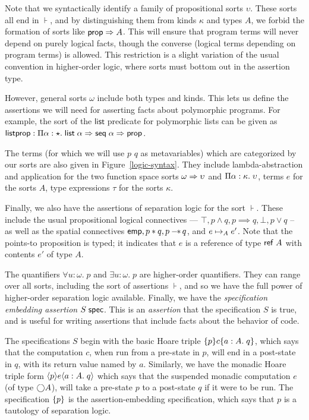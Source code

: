 Note that we syntactically identify a family of propositional sorts
$\upsilon$. These sorts all end in $\assert$, and by distinguishing
them from kinds $\kappa$ and types $A$, we forbid the formation of
sorts like $\mathsf{prop} \Rightarrow A$. This will ensure that program terms will
never depend on purely logical facts, though the converse (logical
terms depending on program terms) is allowed. This restriction is a
slight variation of the usual convention in higher-order logic, where
sorts must bottom out in the assertion type.

However, general sorts $\omega$ include both types and kinds. This
lets us define the assertions we will need for asserting facts about
polymorphic programs. For example, the sort of the $\mathsf{list}$
predicate for polymorphic lists can be given as $\mathsf{listprop} :
\Pi {\alpha}:{\star}.\;{\mathsf{list}\;{\alpha} \Rightarrow \mathsf{seq}\;{\alpha} \Rightarrow
  \mathsf{prop}}$.


The terms (for which we will use $p$ $q$ as metavariables) which are
categorized by our sorts are also given in Figure~\ref{logic-syntax}.
They include lambda-abstraction and application for the two function
space sorts $\omega \Rightarrow \upsilon$ and
$\Pi {\alpha}:{\kappa}.\;{\upsilon}$, terms $e$ for the sorts $A$,
type expressions $\tau$ for the sorts $\kappa$.

Finally, we also have the assertions of separation logic for the sort
$\assert$.  These include the usual propositional logical connectives
--- $\top, p \land q, p \implies q, \bot, p \vee q$ -- as well as the
spatial connectives $\mathsf{emp}, p * q, p -\!\!*\, q$, and $e \mapsto_A
e'$. Note that the points-to proposition is typed; it indicates that
$e$ is a reference of type $\mathsf{ref}\;A$ with contents $e'$ of type
$A$.

The quantifiers $\forall u:\omega.\; p$ and $\exists u:\omega.\; p$
are higher-order quantifiers. They can range over all sorts, including
the sort of assertions $\assert$, and so we have the full power of
higher-order separation logic available.  Finally, we have the
\emph{specification embedding assertion} ${S}\;\mathsf{spec}$.  This is an
\emph{assertion} that the specification $S$ is true, and is useful for
writing assertions that include facts about the behavior of code.

The specifications $S$ begin with the basic Hoare triple
$\{{p}\}{c}\{{a:A}.\;{q}\}$, which says that the computation $c$, when run
from a pre-state in $p$, will end in a post-state in $q$, with its
return value named by $a$. Similarly, we have the monadic Hoare triple
form $\langle{p}\rangle{e}\langle{a:A}.\;{q}\rangle$ which says that the suspended monadic
computation $e$ (of type $\bigcirc{A}$), will take a pre-state $p$ to a
post-state $q$ if it were to be run. The specification $\{{p}\}$ is
the assertion-embedding specification, which says that $p$ is a
tautology of separation logic. 

